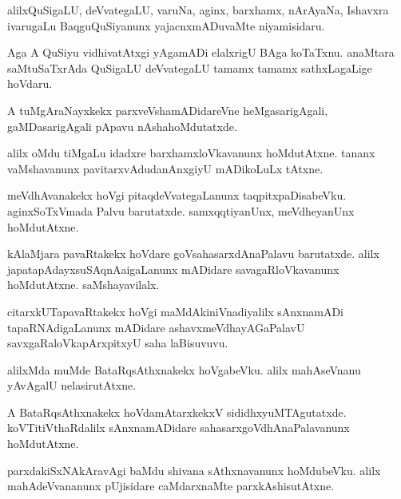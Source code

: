 \documentclass{article}
\begin{document}
\begin{mn}
alilxQuSigaLU, deVvategaLU, varuNa, aginx, barxhamx, nArAyaNa, Ishavxra ivarugaLu BaqguQuSiyanunx 
yajacnxmADuvaMte niyamisidaru.
\end{mn}

\begin{mn}
Aga A QuSiyu vidhivatAtxgi yAgamADi elalxrigU BAga koTaTxnu. anaMtara saMtuSaTxrAda QuSigaLU 
deVvategaLU tamamx tamamx sathxLagaLige hoVdaru.
\end{mn}

\begin{mn}
A tuMgAraNayxkekx parxveVshamADidareVne heMgasarigAgali, gaMDasarigAgali pApavu nAshahoMdutatxde.
\end{mn}

\begin{mn}
alilx oMdu tiMgaLu idadxre barxhamxloVkavanunx hoMdutAtxne. tananx vaMshavanunx 
pavitarxvAdudanAnxgiyU mADikoLuLx tAtxne.
\end{mn}


\begin{mn}
meVdhAvanakekx hoVgi pitaqdeVvategaLanunx taqpitxpaDisabeVku. aginxSoTxVmada Palvu barutatxde. 
samxqqtiyanUnx, meVdheyanUnx hoMdutAtxne.
\end{mn}

\begin{mn}
kAlaMjara pavaRtakekx hoVdare goVsahasarxdAnaPalavu barutatxde. alilx 
japatapAdayxsuSAqnAaigaLanunx mADidare savagaRloVkavanunx hoMdutAtxne. saMshayavilalx.
\end{mn}

\begin{mn}
citarxkUTapavaRtakekx hoVgi maMdAkiniVnadiyalilx sAnxnamADi tapaRNAdigaLanunx mADidare 
ashavxmeVdhayAGaPalavU savxgaRaloVkapArxpitxyU saha laBisuvuvu.
\end{mn}

\begin{mn}
alilxMda muMde BataRqsAthxnakekx hoVgabeVku. alilx mahAseVnanu yAvAgalU nelasirutAtxne.
\end{mn}

\begin{mn}
A BataRqsAthxnakekx hoVdamAtarxkekxV sididhxyuMTAgutatxde. koVTitiVthaRdalilx sAnxnamADidare 
sahasarxgoVdhAnaPalavanunx hoMdutAtxne.
\end{mn}

\begin{mn}
parxdakiSxNAkAravAgi baMdu shivana sAthxnavanunx hoMdubeVku. alilx mahAdeVvananunx pUjisidare 
caMdarxnaMte parxkAshisutAtxne.
\end{mn}
\end{document}
